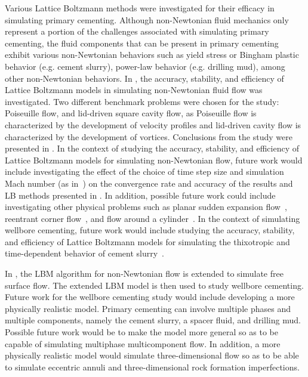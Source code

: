 \documentclass[pdftex,ms]{pittetd}
\begin{document}
Various Lattice Boltzmann methods were investigated for their efficacy in simulating primary cementing.
Although non-Newtonian fluid mechanics only represent a portion of the challenges associated with simulating primary cementing, the fluid components that can be present in primary cementing exhibit various non-Newtonian behaviors such as yield stress or Bingham plastic behavior (e.g. cement slurry), power-law behavior (e.g. drilling mud), among other non-Newtonian behaviors.
In , the accuracy, stability, and efficiency of Lattice Boltzmann models in simulating non-Newtonian fluid flow was investigated.
Two different benchmark problems were chosen for the study: Poiseuille flow, and lid-driven square cavity flow, as Poiseuille flow is characterized by the development of velocity profiles and lid-driven cavity flow is characterized by the development of vortices.
Conclusions from the study were presented in .
In the context of studying the accuracy, stability, and efficiency of Lattice Boltzmann models for simulating non-Newtonian flow, future work would include investigating the effect of the choice of time step size and simulation Mach number (as in~\cite{conrad2015accuracy}) on the convergence rate and accuracy of the results and LB methods presented in .
In addition, possible future work could include investigating other physical problems such as planar sudden expansion flow~\cite{tang2011binghami,chai2011multiple,chen2014simulations,wang2008lattice}, reentrant corner flow~\cite{gabbanelli2005lattice,yoshino2007numerical}, and flow around a cylinder~\cite{fallah2012multiple}.
In the context of simulating wellbore cementing, future work would include studying the accuracy, stability, and efficiency of Lattice Boltzmann models for simulating the thixotropic and time-dependent behavior of cement slurry~\cite{roussel2005steady}.

In , the LBM algorithm for non-Newtonian flow is extended to simulate free surface flow.
The extended LBM model is then used to study wellbore cementing.
Future work for the wellbore cementing study would include developing a more physically realistic model.
Primary cementing can involve multiple phases and multiple components, namely the cement slurry, a spacer fluid, and drilling mud.
Possible future work would be to make the model more general so as to be capable of simulating multiphase multicomponent flow.
In addition, a more physically realistic model would simulate three-dimensional flow so as to be able to simulate eccentric annuli and three-dimensional rock formation imperfections.



\end{document}
